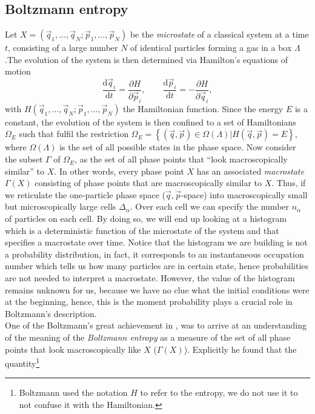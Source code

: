 \subsection{ Boltzmann entropy}
Let  $X=(\vec{q}_1,\ldots,\vec{q}_N;\vec{p}_1,\ldots,\vec{p}_N)$ be the \textit{microstate} of a classical system at a time $t$, consisting of a large number $N$ of identical particles forming a gas in a box $\Lambda$.The evolution of the system is then determined via Hamilton's equations of motion
\begin{equation}
\frac{\mathrm{d} \vec{q}_i}{ \mathrm{d} t} = \frac{\partial H}{\partial \vec{p}_i}, \qquad \frac{\mathrm{d} \vec{p}_i}{ \mathrm{d} t} = -\frac{\partial H}{\partial \vec{q}_i},
\end{equation}
with $H(\vec{q}_1,\ldots,\vec{q}_N;\vec{p}_1,\ldots,\vec{p}_N)$ the Hamiltonian function. Since the energy $E$ is a constant, the evolution of the system is then confined to a set of Hamiltonians $\Omega_{E}$ such that fulfil the restriction $\Omega_{E}=\left\{(\vec{q},\vec{p})\in \Omega(\Lambda) | H(\vec{q},\vec{p})=E\right\}$, where $\Omega(\Lambda)$ is the set of all possible states in the phase space. Now consider the subset $\Gamma$ of $\Omega_E$, as the set of all phase points that ``look macroscopically similar'' to $X$. In other words, every phase point $X$ has an associated \textit{macrostate}  $\Gamma(X)$ consisting of phase points that are macroscopically similar to $X$. Thus, if we reticulate the one-particle phase space ($\vec{q},\vec{p}$-space) into macroscopically small but microscopically large cells $\Delta_{\alpha}$. Over each cell we can specify the number $n_\alpha$ of particles on each cell. By doing so, we will end up looking at a histogram which is a deterministic function of the microstate of the system and that specifies a macrostate over time. Notice that the histogram we are building is not a probability distribution, in fact, it corresponds to an instantaneous occupation number which tells us how many particles are in certain state, hence probabilities are not needed to interpret a macrostate. However, the value of the histogram remains unknown for us, because we have no clue what the initial conditions were at the beginning, hence, this is the moment probability plays a crucial role in Boltzmann's description.\\
\indent One of the Boltzmann's great achievement in  \cite{boltzmann1871prioritat}, was to arrive at an understanding of the meaning of the \textit{Boltzmann entropy} as a measure of the set of all phase points that look macroscopically like $X$ ($\Gamma(X)$). Explicitly he found that the quantity\footnote{Boltzmann used the notation $H$ to refer to the entropy, we do not use it to not confuse it with the Hamiltonian. }
